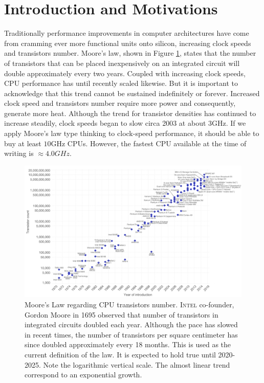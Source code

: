 \section{Introduction and Motivations}
Traditionally performance improvements in computer architectures have come from cramming ever more functional units onto silicon, increasing clock speeds and transistors number.
Moore's law, shown in Figure \ref{fig:moore}, states that the number of transistors that can be placed inexpensively on an integrated circuit will double approximately every two years.
Coupled with increasing clock speeds, CPU performance has until recently scaled likewise.
But it is important to acknowledge that this trend cannot be sustained indefinitely or forever.
Increased clock speed and transistors number require more power and consequently, generate more heat.
Although the trend for transistor densities has continued to increase steadily, clock speeds began to slow circa 2003 at about $3$GHz.
If we apply Moore’s law type thinking to clock-speed performance, it should be able to buy at least $10$GHz CPUs. 
However, the fastest CPU available at the time of writing is $\approx 4.0 GHz$.
\begin{figure}[!htbp]
		\hspace*{-1.8cm}
\centering
\includegraphics[width=1.2\textwidth]{./images/parallel_programming/moore_law2}
\caption[Moore's Law regarding CPUs transistors number.]{Moore's Law regarding CPU transistors number. \textsc{Intel} co-founder, Gordon Moore in 1695 observed that number of transistors in integrated circuits doubled each year. Although the pace has slowed in recent times, the number of transistors per square centimeter has since doubled approximately every 18 months. This is used as the current definition of the law. It is expected to hold true until 2020-2025. Note the logarithmic vertical scale. The almost linear trend correspond to an exponential growth.
}
\label{fig:moore}
\end{figure}
